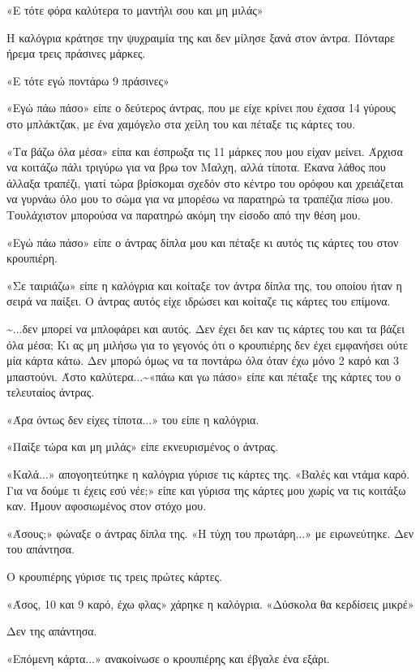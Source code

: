 \documentclass[12pt,twoside, openany]{book}
\begin{document}
«Ε τότε φόρα καλύτερα το μαντήλι σου και μη μιλάς»

Η καλόγρια κράτησε την ψυχραιμία της και δεν μίλησε ξανά στον άντρα. Πόνταρε ήρεμα τρεις πράσινες μάρκες.

«Ε τότε εγώ ποντάρω 9 πράσινες»

«Εγώ πάω πάσο» είπε ο δεύτερος άντρας, που με είχε κρίνει που έχασα 14 γύρους στο μπλάκτζακ, με ένα χαμόγελο στα χείλη του και πέταξε τις κάρτες του.

«Τα βάζω όλα μέσα» είπα και έσπρωξα τις 11 μάρκες που μου είχαν μείνει. Άρχισα να κοιτάζω πάλι τριγύρω για να βρω τον Μαλχη, αλλά τίποτα. Έκανα λάθος που άλλαξα τραπέζι, γιατί τώρα βρίσκομαι σχεδόν στο κέντρο του ορόφου και χρειάζεται να γυρνάω όλο μου το σώμα για να μπορέσω να παρατηρώ τα τραπέζια πίσω μου. Τουλάχιστον μπορούσα να παρατηρώ ακόμη την είσοδο από την θέση μου.

«Εγώ πάω πάσο» είπε ο άντρας δίπλα μου και πέταξε κι αυτός τις κάρτες του στον κρουπιέρη.

«Σε ταιριάζω» είπε η καλόγρια και κοίταξε τον άντρα δίπλα της, του οποίου ήταν η σειρά να παίξει. Ο άντρας αυτός είχε ιδρώσει και κοίταζε τις κάρτες του επίμονα.

\textasciitilde ...δεν μπορεί να μπλοφάρει και αυτός. Δεν έχει δει καν τις κάρτες του και τα βάζει όλα μέσα; Κι ας μη μιλήσω για το γεγονός ότι ο κρουπιέρης δεν έχει εμφανήσει ούτε μία κάρτα κάτω. Δεν μπορώ όμως να τα ποντάρω όλα όταν έχω μόνο 2 καρό και 3 μπαστούνι. Άστο καλύτερα...\textasciitilde «πάω και γω πάσο» είπε και πέταξε της κάρτες του ο τελευταίος άντρας.

«Άρα όντως δεν είχες τίποτα...» του είπε η καλόγρια.

«Παίξε τώρα και μη μιλάς» είπε εκνευρισμένος ο άντρας.

«Καλά...» απογοητεύτηκε η καλόγρια γύρισε τις κάρτες της. «Βαλές και ντάμα καρό. Για να δούμε τι έχεις εσύ νέε;» είπε και γύρισα της κάρτες μου χωρίς να τις κοιτάξω καν. Ήμουν αφοσιωμένος στον στόχο μου.

«Άσους;» φώναξε ο άντρας δίπλα της. «Η τύχη του πρωτάρη...» με ειρωνεύτηκε. Δεν του απάντησα.

Ο κρουπιέρης γύρισε τις τρεις πρώτες κάρτες.

«Άσος, 10 και 9 καρό, έχω φλας» χάρηκε η καλόγρια. «Δύσκολα θα κερδίσεις μικρέ»

Δεν της απάντησα.

«Επόμενη κάρτα...» ανακοίνωσε ο κρουπιέρης και έβγαλε ένα εξάρι.
\end{document}
